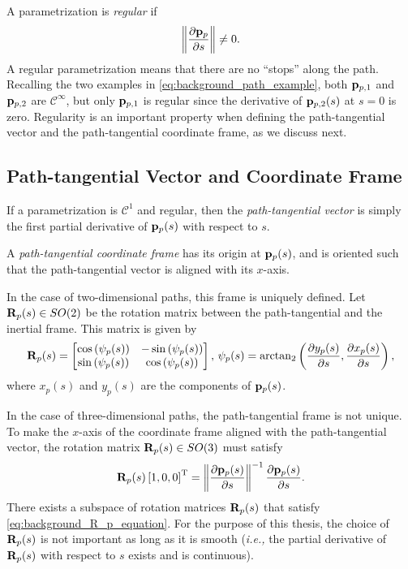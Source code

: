 A parametrization is \emph{regular} if
\begin{equation}
    \left\|\frac{\partial \mathbf{p}_p}{\partial s}\right\| \neq 0.
\end{equation}
A regular parametrization means that there are no ``stops'' along the path.
Recalling the two examples in \eqref{eq:background_path_example}, both $\mathbf{p}_{p, 1}$ and $\mathbf{p}_{p, 2}$ are $\mathcal{C}^{\infty}$, but only $\mathbf{p}_{p, 1}$ is regular since the derivative of $\mathbf{p}_{p, 2}(s)$ at $s = 0$ is zero.
Regularity is an important property when defining the path-tangential vector and the path-tangential coordinate frame, as we discuss next.

\subsection{Path-tangential Vector and Coordinate Frame}
\label{sec:background_path_tangential}
If a parametrization is $\mathcal{C}^1$ and regular, then the \emph{path-tangential vector} is simply the first partial derivative of $\mathbf{p}_p(s)$ with respect to $s$.

A \emph{path-tangential coordinate frame} has its origin at $\mathbf{p}_p(s)$, and is oriented such that the path-tangential vector is aligned with its $x$-axis.

In the case of two-dimensional paths, this frame is uniquely defined.
Let $\mathbf{R}_p(s) \in SO(2)$ be the rotation matrix between the path-tangential and the inertial frame.
This matrix is given by
\begin{equation}
    \mathbf{R}_p(s) = 
    \begin{bmatrix}
        \cos\left(\psi_{p}(s)\right) & -\sin\left(\psi_{p}(s)\right) \\ \sin\left(\psi_{p}(s)\right) & \cos\left(\psi_{p}(s)\right)
    \end{bmatrix}, \,
    \psi_{p}(s) = \mathrm{arctan}_{2}\left(\frac{\partial  y_{p}(s)}{\partial s}, \frac{\partial  x_{p}(s)}{\partial s}\right),
    \label{eq:background_path_tangential_2D}
\end{equation}
where $x_p(s)$ and $y_p(s)$ are the components of $\mathbf{p}_p(s)$.

In the case of three-dimensional paths, the path-tangential frame is not unique.
To make the $x$-axis of the coordinate frame aligned with the path-tangential vector, the rotation matrix $\mathbf{R}_p(s) \in SO(3)$ must satisfy
\begin{equation}
    \mathbf{R}_p(s) \left[1, 0, 0\right]^{\mathrm{T}} = \left\|\frac{\partial \mathbf{p}_p(s)}{\partial s}\right\|^{-1} \frac{\partial \mathbf{p}_p(s)}{\partial s}.
    \label{eq:background_R_p_equation}
\end{equation}
There exists a subspace of rotation matrices $\mathbf{R}_p(s)$ that satisfy \eqref{eq:background_R_p_equation}.
For the purpose of this thesis, the choice of $\mathbf{R}_p(s)$ is not important as long as it is smooth (\emph{i.e.,} the partial derivative of $\mathbf{R}_p(s)$ with respect to $s$ exists and is continuous).

